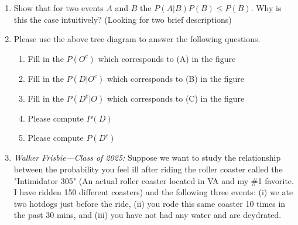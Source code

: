 \begin{enumerate}
   
   \item Show that for two events $A$ and $B$ the $P(A|B)P(B)  \leq P(B)$. Why is this the case intuitively? (Looking for two brief descriptions)
   \clearpage
   \item \begin{figure}[ht!]
       \centering
   \end{figure} Please use the above tree diagram to answer the following questions. 
   \begin{enumerate}
       \item Fill in the $P(O^{c})$ which corresponds to (A) in the figure
       \item Fill in the $P(D | O^{c})$ which corresponds to (B) in the figure
       \item Fill in the $P(D^{c} | O)$ which corresponds to (C) in the figure
       \item Please compute $P(D)$
       \item Please compute $P(D^{c})$
   \end{enumerate}
   
   
   \item \textit{Walker Frisbie---Class of 2025:} Suppose we want to study the relationship between the probability you feel ill after riding the roller coaster called the "Intimidator 305" (An actual roller coaster located in VA and my \#1 favorite. I have ridden 150 different coasters) and the following three events: (i) we ate two hotdogs just before the ride, (ii) you rode this same coaster 10 times in the past 30 mins, and (iii) you have not had any water and are deydrated.\\
   

\end{enumerate}
